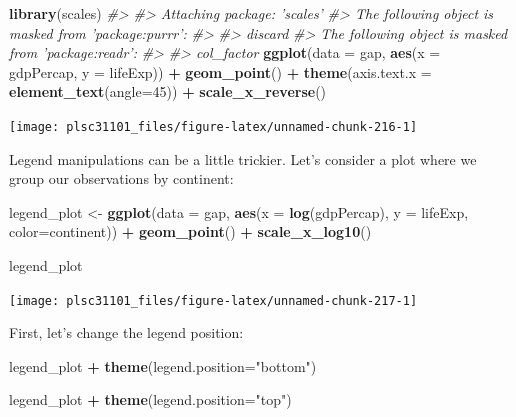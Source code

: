 \documentclass[
]{book}
\newenvironment{Shaded}{\begin{snugshade}}{\end{snugshade}}
\newcommand{\CommentTok}[1]{\textcolor[rgb]{0.56,0.35,0.01}{\textit{#1}}}
\newcommand{\DataTypeTok}[1]{\textcolor[rgb]{0.13,0.29,0.53}{#1}}
\newcommand{\DecValTok}[1]{\textcolor[rgb]{0.00,0.00,0.81}{#1}}
\newcommand{\KeywordTok}[1]{\textcolor[rgb]{0.13,0.29,0.53}{\textbf{#1}}}
\newcommand{\NormalTok}[1]{#1}
\newcommand{\OperatorTok}[1]{\textcolor[rgb]{0.81,0.36,0.00}{\textbf{#1}}}
\newcommand{\StringTok}[1]{\textcolor[rgb]{0.31,0.60,0.02}{#1}}
\begin{document}
\begin{Shaded}
\begin{Highlighting}[]
\KeywordTok{library}\NormalTok{(scales)}
\CommentTok{#> }
\CommentTok{#> Attaching package: 'scales'}
\CommentTok{#> The following object is masked from 'package:purrr':}
\CommentTok{#> }
\CommentTok{#>     discard}
\CommentTok{#> The following object is masked from 'package:readr':}
\CommentTok{#> }
\CommentTok{#>     col_factor}
\KeywordTok{ggplot}\NormalTok{(}\DataTypeTok{data =}\NormalTok{ gap, }\KeywordTok{aes}\NormalTok{(}\DataTypeTok{x =}\NormalTok{ gdpPercap, }\DataTypeTok{y =}\NormalTok{ lifeExp)) }\OperatorTok{+}
\StringTok{  }\KeywordTok{geom_point}\NormalTok{() }\OperatorTok{+}
\StringTok{  }\KeywordTok{theme}\NormalTok{(}\DataTypeTok{axis.text.x =} \KeywordTok{element_text}\NormalTok{(}\DataTypeTok{angle=}\DecValTok{45}\NormalTok{)) }\OperatorTok{+}
\StringTok{  }\KeywordTok{scale_x_reverse}\NormalTok{()}
\end{Highlighting}
\end{Shaded}

\begin{center}\texttt{[image: plsc31101\_files/figure-latex/unnamed-chunk-216-1]} \end{center}

Legend manipulations can be a little trickier. Let's consider a plot where we group our observations by continent:

\begin{Shaded}
\begin{Highlighting}[]
\NormalTok{legend_plot <-}\StringTok{ }\KeywordTok{ggplot}\NormalTok{(}\DataTypeTok{data =}\NormalTok{ gap, }\KeywordTok{aes}\NormalTok{(}\DataTypeTok{x =} \KeywordTok{log}\NormalTok{(gdpPercap), }\DataTypeTok{y =}\NormalTok{ lifeExp, }\DataTypeTok{color=}\NormalTok{continent)) }\OperatorTok{+}
\StringTok{  }\KeywordTok{geom_point}\NormalTok{() }\OperatorTok{+}\StringTok{ }
\StringTok{  }\KeywordTok{scale_x_log10}\NormalTok{()}

\NormalTok{legend_plot}
\end{Highlighting}
\end{Shaded}

\begin{center}\texttt{[image: plsc31101\_files/figure-latex/unnamed-chunk-217-1]} \end{center}

First, let's change the legend position:

\begin{Shaded}
\begin{Highlighting}[]
\NormalTok{legend_plot }\OperatorTok{+}\StringTok{ }
\StringTok{  }\KeywordTok{theme}\NormalTok{(}\DataTypeTok{legend.position=}\StringTok{"bottom"}\NormalTok{)}

\NormalTok{legend_plot }\OperatorTok{+}\StringTok{ }
\StringTok{  }\KeywordTok{theme}\NormalTok{(}\DataTypeTok{legend.position=}\StringTok{"top"}\NormalTok{)}
\end{Highlighting}
\end{Shaded}
\end{document}
